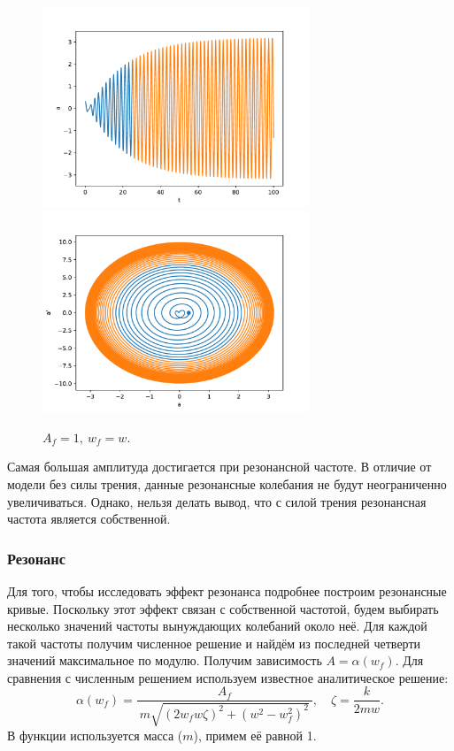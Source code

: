             \begin{figure}[H]
                \centering
                \includegraphics[width=8cm]{pictures/5resonance3.pdf}
                \includegraphics[width=8cm]{pictures/5resonance3p.pdf}
                \caption{$A_f = 1, ~ w_f = w$.}
            \end{figure}
            Самая большая амплитуда достигается при резонансной частоте. В отличие от модели без силы трения, данные резонансные колебания не будут неограниченно увеличиваться. Однако, нельзя делать вывод, что с силой трения резонансная частота является собственной.

        \subsubsection{Резонанс}
            Для того, чтобы исследовать эффект резонанса подробнее построим резонансные кривые. Поскольку этот эффект связан с собственной частотой, будем выбирать несколько значений частоты вынуждающих колебаний около неё. Для каждой такой частоты получим численное решение и найдём из последней четверти значений максимальное по модулю. Получим зависимость \( A = \alpha (w_f) \). Для сравнения с численным решением используем известное аналитическое решение:
            \[
                \alpha (w_f) = \frac{A_f}{~m\sqrt{ \left( 2 w_f w \zeta \right)^2 + \left( w^2 - w_f^2 \right)^2 }~}, \quad \zeta = \frac{k}{2 m w}.
            \]
            В функции используется масса (\( m \)), примем её равной 1.

